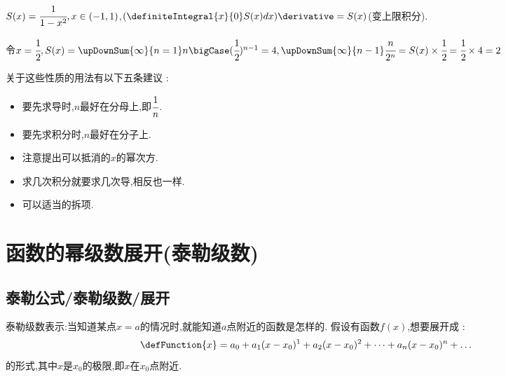 {{{{\begin{itemize}
          $S(x) = \cfrac{1}{1 - x^2},x \in (-1,1)$,$(\definiteIntegral{x}{0}S(x)dx)\derivative = S(x)$(变上限积分).

          令$x = \cfrac{1}{2},S(x) = \upDownSum{\infty}{n = 1}n\bigCase(\cfrac{1}{2})^{n - 1} = 4,\upDownSum{\infty}{n - 1}\cfrac{n}{2^n} = S(x)\times\cfrac{1}{2} = \cfrac{1}{2} \times 4 = 2$
  \end{itemize}

  关于这些性质的用法有以下五条建议 :
  \begin{itemize}
    \item 要先求导时,$n$最好在分母上,即$\cfrac{1}{n}$.
    \item 要先求积分时,$n$最好在分子上.
    \item 注意提出可以抵消的$x$的幂次方.
    \item 求几次积分就要求几次导,相反也一样.
    \item 可以适当的拆项.
  \end{itemize}
}%

}%

\section{函数的幂级数展开(泰勒级数)}{


\subsection{泰勒公式/泰勒级数/展开}{

  泰勒级数表示:当知道某点$x = a$的情况时,就能知道$a$点附近的函数是怎样的.
  假设有函数$f(x)$,想要展开成 : $$
    \defFunction{x} = a_0 + a_1(x - x_0)^1 + a_2(x - x_0)^2 + \dots + a_n(x - x_0)^n + \dots
  $$
  的形式,其中$x$是$x_0$的极限,即$x$在$x_0$点附近.

}}}}
